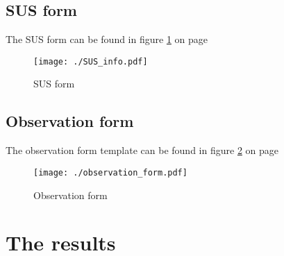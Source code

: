 	     	\subsection{SUS form}
			The SUS form can be found in figure \ref{fig:SUS_form} on page \pageref{fig:SUS_form}
			\begin{figure}[htp]{
			\texttt{[image: ./SUS\_info.pdf]}}
			\caption{SUS form}\label{fig:SUS_form}
			\end{figure}
		\subsection{Observation form}
			The observation form template can be found in figure \ref{fig:observation_form} on page \pageref{fig:observation_form}
			\begin{figure}[htp]{
			\texttt{[image: ./observation\_form.pdf]}}
			\caption{Observation form}\label{fig:observation_form}
			\end{figure}

	\section{The results}
	
